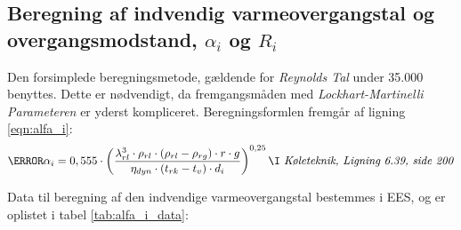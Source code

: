 \documentclass[../Hovedrapport.tex]{subfiles}
\begin{document}
\subsection{Beregning af indvendig varmeovergangstal og overgangsmodstand, $\alpha_i$ og $R_i$}
Den forsimplede beregningsmetode, gældende for \textit{Reynolds Tal} under 35.000 benyttes. Dette er nødvendigt, da fremgangsmåden med \textit{Lockhart-Martinelli Parameteren} er yderst kompliceret. Beregningsformlen fremgår af ligning \ref{eqn:alfa_i}:
\begin{equation}
\label{eqn:alfa_i}
\V{\alpha}_{i}   = 0,555\cdot  \left( \frac {\lambda_{rl}^{3}\cdot \rho_{rl}\cdot  \left( \rho_{rl}-\rho_{rg} \right) \cdot r\cdot g}{\eta_{dyn} \cdot  \left( t_{rk}-t_{v} \right) \cdot d_{i} } \right) ^{0,25}	 
\mbox{\I \textit{Køleteknik, Ligning 6.39, side 200}}
\end{equation}

\newpage
Data til beregning af den indvendige varmeovergangstal bestemmes i EES, og er oplistet i tabel \ref{tab:alfa_i_data}:
\end{document}
